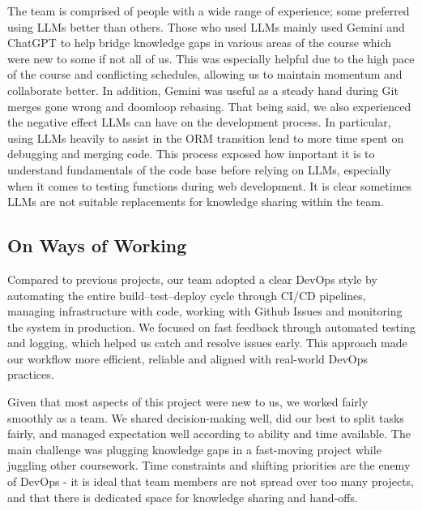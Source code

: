 The team is comprised of people with a wide range of experience; some preferred using LLMs better than others. Those who used LLMs mainly used Gemini and ChatGPT to help bridge knowledge gaps in various areas of the course which were new to some if not all of us. This was especially helpful due to the high pace of the course and conflicting schedules, allowing us to maintain momentum and collaborate better. In addition, Gemini was useful as a steady hand during Git merges gone wrong and doomloop rebasing. That being said, we also experienced the negative effect LLMs can have on the development process. In particular, using LLMs heavily to assist in the ORM transition lend to more time spent on debugging and merging code. This process exposed how important it is to understand fundamentals of the code base before relying on LLMs, especially when it comes to testing functions during web development. It is clear sometimes LLMs are not suitable replacements for knowledge sharing within the team. 


\subsection{On Ways of Working}

Compared to previous projects, our team adopted a clear DevOps style by automating the entire build–test–deploy cycle through CI/CD pipelines, managing infrastructure with code, working with Github Issues and monitoring the system in production. We focused on fast feedback through automated testing and logging, which helped us catch and resolve issues early. This approach made our workflow more efficient, reliable and aligned with real-world DevOps practices. 

Given that most aspects of this project were new to us, we worked fairly smoothly as a team. We shared decision-making well, did our best to split tasks fairly, and managed expectation well according to ability and time available. The main challenge was plugging knowledge gaps in a fast-moving project while juggling other coursework. Time constraints and shifting priorities are the enemy of DevOps - it is ideal that team members are not spread over too many projects, and that there is dedicated space for knowledge sharing and hand-offs. 

